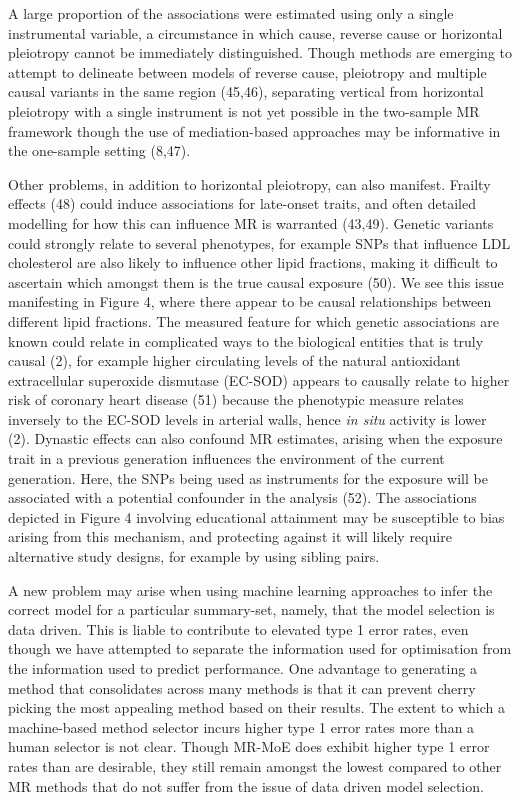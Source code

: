 \documentclass[]{article}
\begin{document}
A large proportion of the associations were estimated using only a
single instrumental variable, a circumstance in which cause, reverse
cause or horizontal pleiotropy cannot be immediately distinguished.
Though methods are emerging to attempt to delineate between models of
reverse cause, pleiotropy and multiple causal variants in the same
region (45,46), separating vertical from horizontal pleiotropy with a
single instrument is not yet possible in the two-sample MR framework
though the use of mediation-based approaches may be informative in the
one-sample setting (8,47).

Other problems, in addition to horizontal pleiotropy, can also manifest.
Frailty effects (48) could induce associations for late-onset traits,
and often detailed modelling for how this can influence MR is warranted
(43,49). Genetic variants could strongly relate to several phenotypes,
for example SNPs that influence LDL cholesterol are also likely to
influence other lipid fractions, making it difficult to ascertain which
amongst them is the true causal exposure (50). We see this issue
manifesting in Figure 4, where there appear to be causal relationships
between different lipid fractions. The measured feature for which
genetic associations are known could relate in complicated ways to the
biological entities that is truly causal (2), for example higher
circulating levels of the natural antioxidant extracellular superoxide
dismutase (EC-SOD) appears to causally relate to higher risk of coronary
heart disease (51) because the phenotypic measure relates inversely to
the EC-SOD levels in arterial walls, hence \emph{in situ} activity is
lower (2). Dynastic effects can also confound MR estimates, arising when
the exposure trait in a previous generation influences the environment
of the current generation. Here, the SNPs being used as instruments for
the exposure will be associated with a potential confounder in the
analysis (52). The associations depicted in Figure 4 involving
educational attainment may be susceptible to bias arising from this
mechanism, and protecting against it will likely require alternative
study designs, for example by using sibling pairs.

A new problem may arise when using machine learning approaches to infer
the correct model for a particular summary-set, namely, that the model
selection is data driven. This is liable to contribute to elevated type
1 error rates, even though we have attempted to separate the information
used for optimisation from the information used to predict performance.
One advantage to generating a method that consolidates across many
methods is that it can prevent cherry picking the most appealing method
based on their results. The extent to which a machine-based method
selector incurs higher type 1 error rates more than a human selector is
not clear. Though MR-MoE does exhibit higher type 1 error rates than are
desirable, they still remain amongst the lowest compared to other MR
methods that do not suffer from the issue of data driven model
selection.
\end{document}
